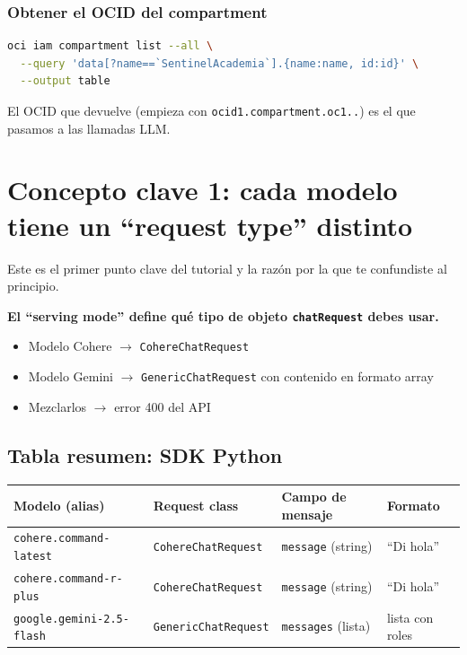 \documentclass[11pt,a4paper,oneside]{article}
\begin{document}
\subsubsection{Obtener el OCID del compartment}

\begin{lstlisting}[language=bash,caption={Listar compartments}]
oci iam compartment list --all \
  --query 'data[?name==`SentinelAcademia`].{name:name, id:id}' \
  --output table
\end{lstlisting}

El OCID que devuelve (empieza con \texttt{ocid1.compartment.oc1..}) es el que pasamos a las llamadas LLM.

\section{Concepto clave 1: cada modelo tiene un ``request type'' distinto}

Este es el primer punto clave del tutorial y la razón por la que te confundiste al principio.

\begin{tcolorbox}[colback=warnorange!5!white,colframe=warnorange,title={\textbf{Regla de oro \#1}}]
\textbf{El ``serving mode'' define qué tipo de objeto \texttt{chatRequest} debes usar.}
\begin{itemize}
  \item Modelo Cohere $\rightarrow$ \texttt{CohereChatRequest}
  \item Modelo Gemini $\rightarrow$ \texttt{GenericChatRequest} con contenido en formato array
  \item Mezclarlos $\rightarrow$ error 400 del API
\end{itemize}
\end{tcolorbox}

\subsection{Tabla resumen: SDK Python}

\begin{center}
\small
\begin{tabular}{@{}llll@{}}
\toprule
\textbf{Modelo (alias)} & \textbf{Request class} & \textbf{Campo de mensaje} & \textbf{Formato} \\
\midrule
\rowcolor{blue!10}
\texttt{cohere.command-latest} & \texttt{CohereChatRequest} & \texttt{message} (string) & ``Di hola'' \\
\texttt{cohere.command-r-plus}  & \texttt{CohereChatRequest} & \texttt{message} (string) & ``Di hola'' \\
\rowcolor{blue!10}
\texttt{google.gemini-2.5-flash} & \texttt{GenericChatRequest} & \texttt{messages} (lista) & lista con roles \\
\bottomrule
\end{tabular}
\end{center}
\end{document}
